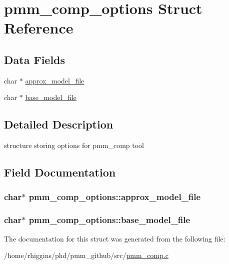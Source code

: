 \hypertarget{structpmm__comp__options}{\section{pmm\-\_\-comp\-\_\-options Struct Reference}
\label{structpmm__comp__options}
}
\subsection*{Data Fields}
\begin{DoxyCompactItemize}
\item 
char $\ast$ \hyperlink{structpmm__comp__options_aa77760fb29a9b1779131bc039f657841}{approx\-\_\-model\-\_\-file}
\item 
char $\ast$ \hyperlink{structpmm__comp__options_ab13a3ea5c10337d0027ba0ff7c6fc7a0}{base\-\_\-model\-\_\-file}
\end{DoxyCompactItemize}


\subsection{Detailed Description}
structure storing options for pmm\-\_\-comp tool 

\subsection{Field Documentation}
\hypertarget{structpmm__comp__options_aa77760fb29a9b1779131bc039f657841}{
\subsubsection[{approx\-\_\-model\-\_\-file}]{\setlength{\rightskip}{0pt plus 5cm}char$\ast$ pmm\-\_\-comp\-\_\-options\-::approx\-\_\-model\-\_\-file}}\label{structpmm__comp__options_aa77760fb29a9b1779131bc039f657841}
\hypertarget{structpmm__comp__options_ab13a3ea5c10337d0027ba0ff7c6fc7a0}{
\subsubsection[{base\-\_\-model\-\_\-file}]{\setlength{\rightskip}{0pt plus 5cm}char$\ast$ pmm\-\_\-comp\-\_\-options\-::base\-\_\-model\-\_\-file}}\label{structpmm__comp__options_ab13a3ea5c10337d0027ba0ff7c6fc7a0}


The documentation for this struct was generated from the following file\-:\begin{DoxyCompactItemize}
\item 
/home/rhiggins/phd/pmm\-\_\-github/src/\hyperlink{pmm__comp_8c}{pmm\-\_\-comp.\-c}\end{DoxyCompactItemize}
